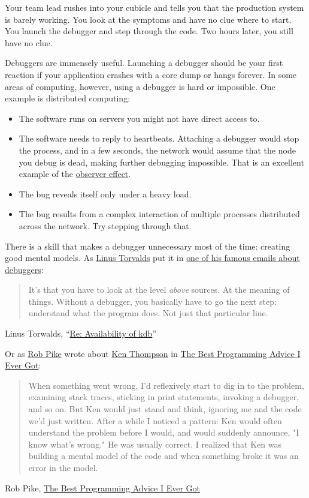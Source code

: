 \documentclass{article}
\begin{document}
Your team lead rushes into your cubicle and tells you that the production system is barely working.
You look at the symptoms and have no clue where to start.
You launch the debugger and step through the code.
Two hours later, you still have no clue.

Debuggers are immensely useful.
Launching a debugger should be your first reaction if your application crashes with a core dump or hangs forever.
In some areas of computing, however, using a debugger is hard or impossible.
One example is distributed computing:
\begin{itemize}
  \item 
    The software runs on servers you might not have direct access to.
  \item 
    The software needs to reply to heartbeats.
    Attaching a debugger would stop the process, and in a few seconds, the network would assume that the node you debug is dead, making further debugging impossible.
    That is an excellent example of the \href{https://en.wikipedia.org/wiki/Observer_effect_(physics)}{observer effect}.
  \item 
    The bug reveals itself only under a heavy load.
  \item 
    The bug results from a complex interaction of multiple processes distributed across the network.
    Try stepping through that.
\end{itemize}

There is a skill that makes a debugger unnecessary most of the time: creating good mental models.
As \href{https://en.wikipedia.org/wiki/Linus_Torvalds}{Linus Torvalds} put it in \href{https://lkml.org/lkml/2000/9/6/65}{one of his famous emails about debuggers}:

\blockquote{
  It's that you have to look at the level \emph{above} sources.
  At the meaning of things.
  Without a debugger, you basically have to go the next step: understand what the program does.
  Not just that particular line.
}{Linus Torwalds, ``\href{https://lkml.org/lkml/2000/9/6/65}{Re: Availability of kdb}''}

Or as \href{https://en.wikipedia.org/wiki/Rob_Pike}{Rob Pike} wrote about \href{https://en.wikipedia.org/wiki/Ken_Thompson}{Ken Thompson} in \href{https://www.informit.com/articles/article.aspx?p=1941206}{The Best Programming Advice I Ever Got}:

\blockquote{
  When something went wrong, I'd reflexively start to dig in to the problem, examining stack traces, sticking in print statements, invoking a debugger, and so on.
  But Ken would just stand and think, ignoring me and the code we'd just written.
  After a while I noticed a pattern: Ken would often understand the problem before I would, and would suddenly announce, "I know what's wrong."
  He was usually correct.
  I realized that Ken was building a mental model of the code and when something broke it was an error in the model.
}{Rob Pike, \href{https://www.informit.com/articles/article.aspx?p=1941206}{The Best Programming Advice I Ever Got}}
\end{document}
